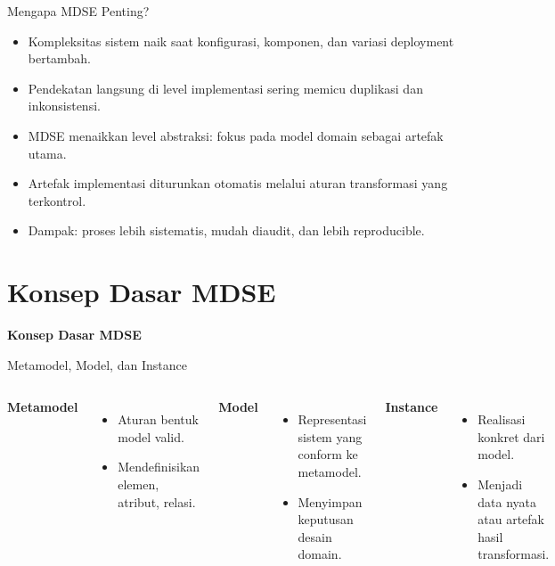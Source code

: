 \documentclass[aspectratio=169, table]{beamer}
\begin{document}
\begin{frame}{Mengapa MDSE Penting?}
\vspace{6pt}
\begin{itemize}
  \item Kompleksitas sistem naik saat konfigurasi, komponen, dan variasi deployment bertambah.
  \item Pendekatan langsung di level implementasi sering memicu duplikasi dan inkonsistensi.
  \item MDSE menaikkan level abstraksi: fokus pada model domain sebagai artefak utama.
  \item Artefak implementasi diturunkan otomatis melalui aturan transformasi yang terkontrol.
  \item Dampak: proses lebih sistematis, mudah diaudit, dan lebih reproducible.
\end{itemize}
\end{frame}

\section{Konsep Dasar MDSE}
\begin{frame}{\hfill}
	\centering
	\Huge{\textbf{Konsep Dasar MDSE}}
\end{frame}

\begin{frame}{Metamodel, Model, dan Instance}
\vspace{8pt}
\begin{columns}[T]
\textbf{Metamodel}
\begin{itemize}
  \item Aturan bentuk model valid.
  \item Mendefinisikan elemen, atribut, relasi.
\end{itemize}

\textbf{Model}
\begin{itemize}
  \item Representasi sistem yang conform ke metamodel.
  \item Menyimpan keputusan desain domain.
\end{itemize}

\textbf{Instance}
\begin{itemize}
  \item Realisasi konkret dari model.
  \item Menjadi data nyata atau artefak hasil transformasi.
\end{itemize}
\end{columns}
\end{frame}
\end{document}
